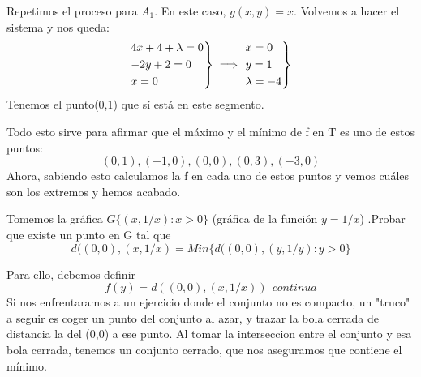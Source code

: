 \begin{ejer}
	Repetimos el proceso para $A_1$. En este caso, $g(x,y) = x$. Volvemos a hacer el sistema y nos queda:
	\[
	\begin{rcases}
	4x +4 +\lambda = 0\\
	-2y +2  = 0\\
	 x = 0
\end{rcases}\implies \begin{rcases}
	x=0\\
	y = 1\\
	\lambda = -4
\end{rcases}
	\]
	Tenemos el punto(0,1) que sí está en este segmento.

	 Todo esto sirve para afirmar que el máximo y el mínimo de f en T es uno de estos puntos:
	\[
	(0,1),(-1,0),(0,0),(0,3),(-3,0)
	\]
	Ahora, sabiendo esto calculamos la f en cada uno de estos puntos y vemos cuáles son los extremos y hemos acabado.


\end{ejer}


\begin{ejer}
	Tomemos la gráfica  $G\{(x,1/x): x > 0\}$ (gráfica de la función $y= 1/x$) .Probar que existe un punto en G tal que
\[
d((0,0),(x,1/x) = Min\{d((0,0),(y,1/y) : y > 0\}
\]

Para ello, debemos definir
\[
f(y) = d((0,0),(x,1/x)) \ \ continua
\]
Si nos enfrentaramos a un ejercicio donde el conjunto no es compacto, un "truco" a seguir es coger un punto del conjunto al azar, y trazar la bola cerrada de distancia la del (0,0) a ese punto. Al tomar la interseccion entre el conjunto y esa bola cerrada, tenemos un conjunto cerrado, que nos aseguramos que contiene el mínimo.
\end{ejer}


